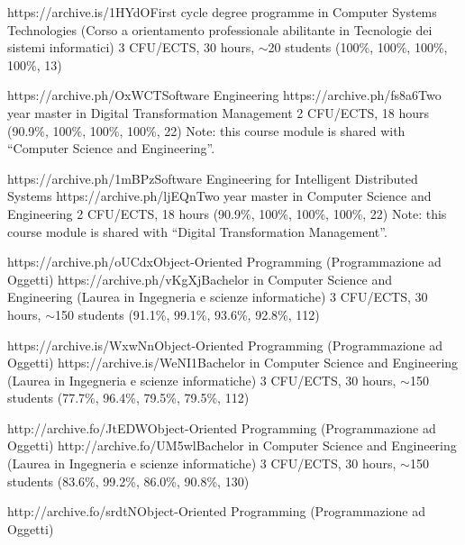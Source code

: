 \begin{outerlist}
        {https://archive.is/1HYdO}{First cycle degree programme in Computer Systems Technologies (Corso a orientamento professionale abilitante in Tecnologie dei sistemi informatici)}
        {3 CFU/ECTS, 30 hours, $\sim$20 students}
        {(100\%, 100\%, 100\%, 100\%, 13)}
        {\oopjava}
    \item[2021/22]
        \unibocourse %
        {https://archive.ph/OxWCT}{Software Engineering}
        {https://archive.ph/fs8a6}{Two year master in Digital Transformation Management}
        {2 CFU/ECTS, 18 hours}
        {(90.9\%, 100\%, 100\%, 100\%, 22)}
        {
            \sedtmeit{}
            Note: this course module is shared with ``Computer Science and Engineering''.
        }
    \item[2021/22]
        \unibocourse %
        {https://archive.ph/1mBPz}{Software Engineering for Intelligent Distributed Systems}
        {https://archive.ph/ljEQn}{Two year master in Computer Science and Engineering}
        {2 CFU/ECTS, 18 hours}
        {(90.9\%, 100\%, 100\%, 100\%, 22)}
        {
            \sedtmeit{}
            Note: this course module is shared with ``Digital Transformation Management''.
        }
    \item[2021/22]
        \unibocourse
        {https://archive.ph/oUCdx}{Object-Oriented Programming (Programmazione ad Oggetti)}
        {https://archive.ph/vKgXj}{Bachelor in Computer Science and Engineering (Laurea in Ingegneria e scienze informatiche)}
        {3 CFU/ECTS, 30 hours, $\sim${}150 students}
        {(91.1\%, 99.1\%, 93.6\%, 92.8\%, 112)}
        {\oopjava}
    \item[2020/21]
        \unibocourse
        {https://archive.is/WxwNn}{Object-Oriented Programming (Programmazione ad Oggetti)}
        {https://archive.is/WeNI1}{Bachelor in Computer Science and Engineering (Laurea in Ingegneria e scienze informatiche)}
        {3 CFU/ECTS, 30 hours, $\sim$150 students}
        {(77.7\%, 96.4\%, 79.5\%, 79.5\%, 112)}
        {\oopjava}
    \item[2019/20]
        \unibocourse
        {http://archive.fo/JtEDW}{Object-Oriented Programming (Programmazione ad Oggetti)}
        {http://archive.fo/UM5wl}{Bachelor in Computer Science and Engineering (Laurea in Ingegneria e scienze informatiche)}
        {3 CFU/ECTS, 30 hours, $\sim$150 students}
        {(83.6\%, 99.2\%, 86.0\%, 90.8\%, 130)}
        {\oopjava}
    \item[2018/19]
        \unibocourse
        {http://archive.fo/srdtN}{Object-Oriented Programming (Programmazione ad Oggetti)}

\end{outerlist}
